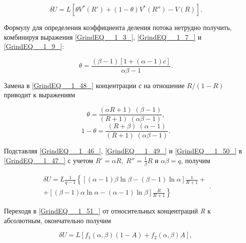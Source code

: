 \begin{equation} \label{GrindEQ__1_47_} 
\delta U=L[\theta V^{*} (R')+(1-\theta )V^{*} (R'')-V(R)].    
\end{equation} 

Формулу для определения коэффициента деления потока нетрудно получить, комбинируя выражения \ref{GrindEQ__1_3_}, \ref{GrindEQ__1_7_} и \ref{GrindEQ__1_9_}:

\begin{equation} \label{GrindEQ__1_48_} 
\theta =\frac{\left(\beta -1\right)\left[1+(\alpha -1)c\right]}{\alpha \beta -1} .        
\end{equation} 

Замена в \ref{GrindEQ__1_48_} концентрации \textit{с} на отношение $R/(1-R)$ приводит к выражениям

\begin{equation} \label{GrindEQ__1_49_} 
\theta =\frac{\left(\alpha R+1\right)\mathrm{\; }\left(\beta -1\right)}{\left(R+1\right)\mathrm{\; }\left(\alpha \beta -1\right)} ,         
\end{equation} 
\begin{equation} \label{GrindEQ__1_50_} 
1-\theta =\frac{\left(R+\beta \right)\mathrm{\; }\left(\alpha -1\right)}{\left(R+1\right)\mathrm{\; }\left(\alpha \beta -1\right)} .         
\end{equation} 

Подставляя \ref{GrindEQ__1_46_}, \ref{GrindEQ__1_49_} и \ref{GrindEQ__1_50_} в \ref{GrindEQ__1_47_} с учетом $R'=\alpha R,\; R''=\frac{1}{\beta } R$ и $\alpha \beta =q$, получим

\begin{equation} \label{GrindEQ__1_51_} 
\begin{array}{l} {\delta U=L\frac{1}{q-1} \left\{\left[\left(\alpha -1\right)\beta \ln \beta -\left(\beta -1\right)\ln \alpha \right]\frac{1}{R+1} +\right. } \\ {\left. +\left[\left(\beta -1\right)\alpha \ln \alpha -\left(\alpha -1\right)\ln \beta \right]\frac{R}{R+1} \right\}} \end{array}.  
\end{equation} 

Переходя в \ref{GrindEQ__1_51_} от относительных концентраций \textit{R} к абсолютным, окончательно получим

\begin{equation} \label{GrindEQ__1_52_} 
\delta U=L[f_{1} (\alpha ,\beta )(1-A)+f_{2} (\alpha ,\beta )A], 
\end{equation} 

